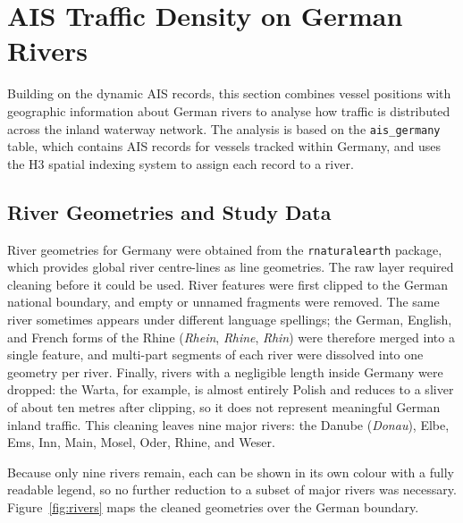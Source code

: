 \documentclass[10pt,a4paper]{article}
\begin{document}

\section {AIS Traffic Density on German Rivers}

Building on the dynamic AIS records, this section combines vessel positions with
geographic information about German rivers to analyse how traffic is distributed
across the inland waterway network. The analysis is based on the
\texttt{ais\_germany} table, which contains AIS records for vessels tracked within
Germany, and uses the H3 spatial indexing system to assign each record to a river.


\subsection{River Geometries and Study Data}

River geometries for Germany were obtained from the \texttt{rnaturalearth} package,
which provides global river centre-lines as line geometries. The raw layer required
cleaning before it could be used. River features were first clipped to the German
national boundary, and empty or unnamed fragments were removed. The same river
sometimes appears under different language spellings; the German, English, and French
forms of the Rhine (\emph{Rhein}, \emph{Rhine}, \emph{Rhin}) were therefore merged
into a single feature, and multi-part segments of each river were dissolved into one
geometry per river. Finally, rivers with a negligible length inside Germany were
dropped: the Warta, for example, is almost entirely Polish and reduces to a sliver
of about ten metres after clipping, so it does not represent meaningful German
inland traffic. This cleaning leaves nine major rivers: the Danube (\emph{Donau}),
Elbe, Ems, Inn, Main, Mosel, Oder, Rhine, and Weser.

Because only nine rivers remain, each can be shown in its own colour with a fully
readable legend, so no further reduction to a subset of major rivers was necessary.
Figure~\ref{fig:rivers} maps the cleaned geometries over the German boundary.
\end{document}
